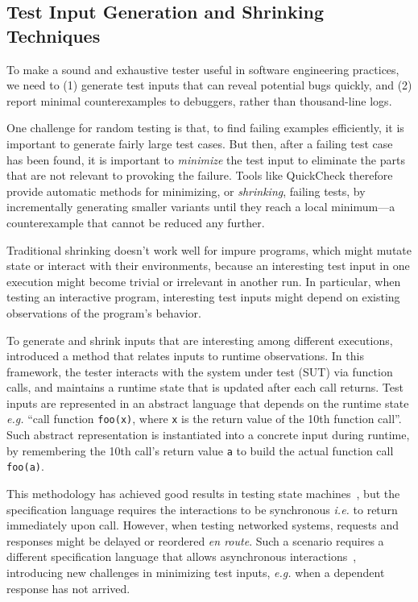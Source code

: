 \documentclass{article}
\newcommand{\ilc}[1]{\lstinline[style=customcoq]{#1}}
\theoremstyle{definition}
\begin{document}
\subsection{Test Input Generation and Shrinking Techniques}
\label{sec:harness}
To make a sound and exhaustive tester useful in software engineering practices,
we need to (1) generate test inputs that can reveal potential bugs quickly, and
(2) report minimal counterexamples to debuggers, rather than thousand-line logs.

One challenge for random testing is that, to find failing examples efficiently,
it is important to generate fairly large test cases.  But then, after a failing
test case has been found, it is important to \textit{minimize} the test input to
eliminate the parts that are not relevant to provoking the failure.  Tools like
QuickCheck therefore provide automatic methods for minimizing, or {\em
  shrinking}, failing tests, by incrementally generating smaller variants until
they reach a local minimum---a counterexample that cannot be reduced any
further.

Traditional shrinking doesn't work well for impure programs, which might mutate
state or interact with their environments, because an interesting test input in
one execution might become trivial or irrelevant in another run.  In particular,
when testing an interactive program, interesting test inputs might depend on
existing observations of the program's behavior.

To generate and shrink inputs that are interesting among different executions,
\textcite{Hughes2007} introduced a method that relates inputs to runtime
observations.  In this framework, the tester interacts with the system under
test (SUT) via function calls, and maintains a runtime state that is updated
after each call returns.  Test inputs are represented in an abstract language
that depends on the runtime state {\it e.g.} ``call function \ilc{foo(x)}, where
\ilc{x} is the return value of the 10th function call''.  Such abstract
representation is instantiated into a concrete input during runtime, by
remembering the 10th call's return value \ilc{a} to build the actual function
call \ilc{foo(a)}.

This methodology has achieved good results in testing state
machines~\cite{Hughes2016}, but the specification language requires the
interactions to be synchronous {\it i.e.} to return immediately upon call.
However, when testing networked systems, requests and responses might be delayed
or reordered \textit{en route}.  Such a scenario requires a different
specification language that allows asynchronous
interactions~\cite{issta21}, introducing new challenges in minimizing
test inputs, {\it e.g.} when a dependent response has not arrived.
\end{document}
